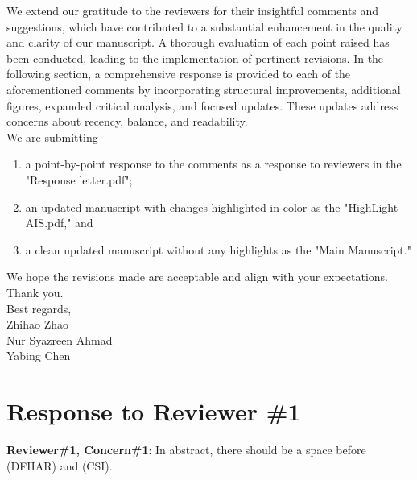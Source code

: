 \documentclass[Afour,sageh,times]{sagej}
\begin{document}
We extend our gratitude to the reviewers for their insightful comments and suggestions, which have contributed to a substantial enhancement in the quality and clarity of our manuscript. A thorough evaluation of each point raised has been conducted, leading to the implementation of pertinent revisions. In the following section, a comprehensive response is provided to each of the aforementioned comments by incorporating structural improvements, additional figures, expanded critical analysis, and focused updates. These updates address concerns about recency, balance, and readability.\\ 

We are submitting
\begin{enumerate}
\item a point-by-point response to the comments as a response to reviewers in the "Response letter.pdf";
\item an updated manuscript with changes highlighted in color as the "HighLight-AIS.pdf," and
\item a clean updated manuscript without any highlights as the "Main Manuscript."
\end{enumerate}

We hope the revisions made are acceptable and align with your expectations.\\

Thank you.\\

\noindent Best regards,\\

\noindent Zhihao Zhao\\
Nur Syazreen Ahmad\\
Yabing Chen

\clearpage
\setlength{\parindent}{0pt}
\section*{Response to Reviewer \#1}  
\bigskip
\textcolor{myGreen}{ \textbf{Reviewer\#1, Concern\#1}: In abstract, there should be a space before (DFHAR) and (CSI). }
\\
\end{document}
